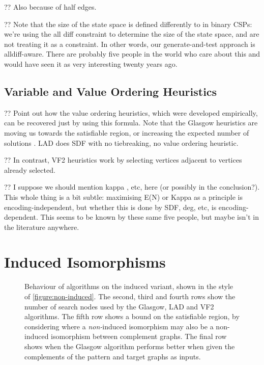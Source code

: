 \documentclass[letterpaper]{article}
\begin{document}
?? Also because of half edges.

?? Note that the size of the state space is defined differently to in binary CSPs: we're using the
all diff constraint to determine the size of the state space, and are not treating it as a
constraint. In other words, our generate-and-test approach is alldiff-aware. There are probably five
people in the world who care about this and would have seen it as very interesting twenty years ago.

\subsection{Variable and Value Ordering Heuristics}

?? Point out how the value ordering heuristics, which were developed empirically, can be recovered
just by using this formula.  Note that the Glasgow heuristics are moving us towards the satisfiable
region, or increasing the expected number of solutions \citep{Gent:1996:EN}. LAD does SDF with no
tiebreaking, no value ordering heuristic.

?? In contrast, VF2 heuristics work by selecting vertices adjacent to vertices already selected.

?? I suppose we should mention kappa \citep{Gent:1996:Kappa}, etc, here (or possibly in the
conclusion?). This whole thing is a bit subtle: maximising E(N) or Kappa as a principle is
encoding-independent, but whether this is done by SDF, deg, etc, is encoding-dependent. This seems
to be known by these same five people, but maybe isn't in the literature anywhere.

\section{Induced Isomorphisms}

\begin{figure*}[tb]
    
    \caption{Behaviour of algorithms on the induced variant, shown in the style
    of \cref{figure:non-induced}. The second, third and fourth rows show the number of search nodes used by the
    Glasgow, LAD and VF2 algorithms. The fifth row shows a bound on the satisfiable region, by
    considering where a \emph{non-}induced isomorphism may also be a non-induced isomorphism between
    complement graphs. The final row shows when the Glasgow algorithm performs better when given the
    complements of the pattern and target graphs as inputs.}\label{figure:induced}
\end{figure*}
\end{document}

